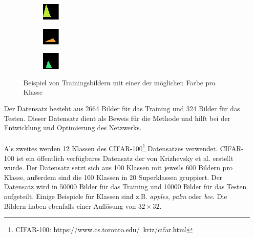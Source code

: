 \begin{figure}[H]
  \begin{subfigure}
    \centering
    \includegraphics[width=.15\textwidth]{resources/dataset/dummy/triangle41.png}
  \end{subfigure}
  \begin{subfigure}
    \centering
    \includegraphics[width=.15\textwidth]{resources/dataset/dummy/triangle49.png}
  \end{subfigure}
  \begin{subfigure}
    \centering
    \includegraphics[width=.15\textwidth]{resources/dataset/dummy/triangle51.png}
  \end{subfigure}
  \caption{Beispiel von Trainingsbildern mit einer der möglichen Farbe pro Klasse}
  \label{image:dummy}
\end{figure}

Der Datensatz besteht aus 2664 Bilder für das Training und 324 Bilder für das Testen.
Dieser Datensatz dient als Beweis für die Methode und hilft bei der Entwicklung und Optimierung des Netzwerks.
\\
\\
Als zweites werden 12 Klassen des CIFAR-100\footnote{CIFAR-100: https://www.cs.toronto.edu/~kriz/cifar.html} Datensatzes verwendet. CIFAR-100 ist 
ein öffentlich verfügbares Datensatz der von Krizhevsky et al. erstellt wurde. Der Datensatz setzt sich aus 100 Klassen mit jeweils 600 
Bildern pro Klasse, außerdem sind die 100 Klassen in 20 Superklassen gruppiert. Der Datensatz wird in 50000 Bilder für das Training und 
10000 Bilder für das Testen aufgeteilt. Einige Beispiele für Klassen sind z.B. \textit{apples}, \textit{palm} oder \textit{bee}. 
Die Bildern haben ebenfalls einer Auflösung von $ 32 \times 32 $.

